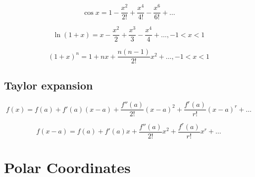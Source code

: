 \documentclass[a4paper,9pt]{scrartcl}
\begin{document}
    \begin{displaymath}
        \cos{x} = 1 - \frac{x^2}{2!} + \frac{x^4}{4!} - \frac{x^6}{6!} + \dots
    \end{displaymath}

    \begin{displaymath}
        \ln{(1+x)} = x - \frac{x^2}{2} + \frac{x^3}{3} - \frac{x^4}{4} + \dots, -1 < x < 1
    \end{displaymath}

    \begin{displaymath}
        (1+x)^n = 1+nx+\frac{n(n-1)}{2!}x^2 + \dots, -1 < x < 1
    \end{displaymath}

    \subsection{Taylor expansion}

    \begin{displaymath}
        f(x) = f(a) + f'(a)(x - a) + \frac{f''(a)}{2!}(x - a)^2 + \frac{f^{r}(a)}{r!}(x - a)^r + \dots
    \end{displaymath}

    \begin{displaymath}
        f(x - a) = f(a) + f'(a)x + \frac{f''(a)}{2!}x^2 + \frac{f^{r}(a)}{r!}x^r + \dots
    \end{displaymath}


    \section{Polar Coordinates}
\end{document}
